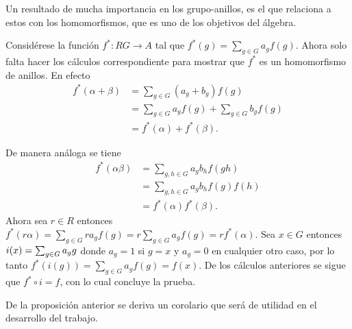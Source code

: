 Un resultado de mucha importancia en los grupo-anillos, es el que relaciona a estos con los homomorfismos, que es uno de los objetivos del álgebra.
\begin{proof*}
Considérese la función $f^* \colon RG \to A$ tal que $f^*(g)=\sum_{g\in G}a_gf(g)$. Ahora solo falta hacer los cálculos correspondiente para mostrar que $f^*$ es un homomorfismo de anillos. En efecto
\begin{align*}
f^*(\alpha + \beta ) &= \sum_{g \in G}(a_g + b_g)f(g)\\ 
&= \sum_{g \in G}a_gf(g) + \sum_{g \in G}b_gf(g)\\ &= f^*(\alpha) + f^*(\beta).
\end{align*}
 
De manera análoga se tiene
\begin{align*}
f^*(\alpha\beta)&=\sum_{g,h\in G}a_gb_hf(gh)\\
&= \sum_{g,h\in G}a_gb_hf(g)f(h)\\ 
&= f^*(\alpha)f^*(\beta).
\end{align*}  Ahora sea $r \in R$ entonces $f^*(r\alpha)=\sum_{g\in G}ra_gf(g)=r\sum_{g\in G}a_gf(g)=rf^*(\alpha)$.
Sea $x \in G$ entonces $i(x) = \sum_{g \in G} a_{g} g$ donde $a_g = 1$ si $g = x$ y $a_g= 0$ en cualquier otro caso, por lo tanto $f^*(i(g))= \sum_{g \in G} a_gf(g)=f(x)$. De los cálculos anteriores se sigue que $f^*\circ i = f$, con lo cual concluye la prueba. 
\qedhere
\end{proof*}
De la proposición anterior se deriva un corolario que será de utilidad en el desarrollo del trabajo.
